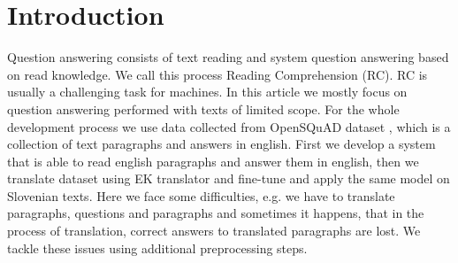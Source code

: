 \documentclass[fleqn,moreauthors,10pt]{ds_report}
\affiliation{\textit{Advisors: Slavko Žitnik}}
\begin{document}
\flushbottom 

\maketitle 

\thispagestyle{empty} 


\section*{Introduction}


Question answering consists of text reading and system question answering based on read knowledge. We call this process Reading Comprehension (RC). RC is usually a challenging task for machines. In this article we mostly focus on question answering performed with texts of limited scope. For the whole development process we use data collected from OpenSQuAD dataset \cite{rajpurkar-etal-2016-squad}, which is a collection of text paragraphs and answers in english. First we develop a system that is able to read english paragraphs and answer them in english, then we translate dataset using EK translator and fine-tune and apply the same model on Slovenian texts. Here we face some difficulties, e.g. we have to translate paragraphs, questions and paragraphs and sometimes it happens, that in the process of translation, correct answers to translated paragraphs are lost. We tackle these issues using additional preprocessing steps.
\end{document}
